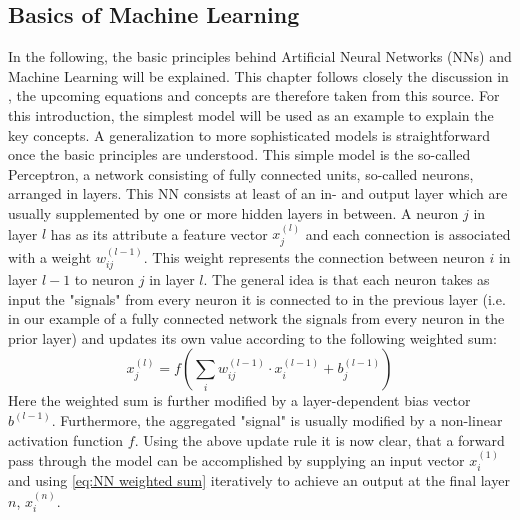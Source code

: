 \documentclass[11pt,a4paper]{article}
\begin{document}
\subsection{Basics of Machine Learning}
\label{ssec:BAsics of Machine Learning}
In the following, the basic principles behind Artificial Neural Networks (NNs) and Machine Learning will be explained. 
This chapter follows closely the discussion in \cite{kubatChapter5Artificial2017}, the upcoming equations and concepts are therefore taken from this source. 
For this introduction, the simplest model will be used as an example to explain the key concepts. 
A generalization to more sophisticated models is straightforward once the basic principles are understood. 
This simple model is the so-called Perceptron, a network consisting of fully connected units, so-called neurons, arranged in layers. 
This NN consists at least of an in- and output layer which are usually supplemented by one or more hidden layers in between. 
A neuron $j$ in layer $l$ has as its attribute a feature vector $x^{(l)}_j$ and each connection is associated with a weight $w_{ij}^{(l-1)}$. 
This weight represents the connection between neuron $i$ in layer $l-1$ to neuron $j$ in layer $l$. 
The general idea is that each neuron takes as input the "signals" from every neuron it is connected to in the previous layer (i.e. in our example of a fully connected network the signals from every neuron in the prior layer) and updates its own value according to the following weighted sum:
\begin{equation}
\label{eq:NN weighted sum}
x^{(l)}_j = f\left(\sum_i w_{ij}^{(l-1)} \cdot x^{(l-1)}_i + b_j^{(l-1)}\right)
\end{equation}
Here the weighted sum is further modified by a layer-dependent bias vector $ b^{(l-1)}$. 
Furthermore, the aggregated "signal" is usually modified by a non-linear activation function $f$. 
Using the above update rule it is now clear, that a forward pass through the model can be accomplished by supplying an input vector $x^{(1)}_i$ and using \autoref{eq:NN weighted sum} iteratively to achieve an output at the final layer $n$, $x^{(n)}_i$. \\
\end{document}
